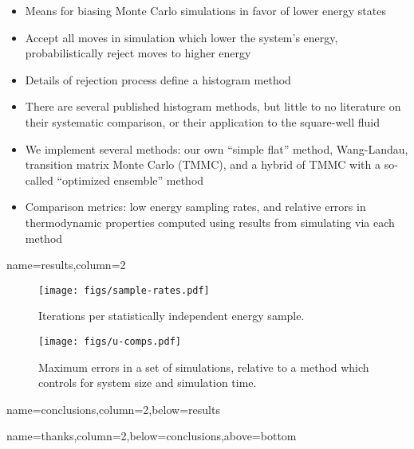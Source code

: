 \documentclass[paperwidth=48in,paperheight=36in,
fontscale=0.27,margin=0.75in]{baposter}
\begin{document}
\begin{poster}
{    %


    \begin{itemize}
    \item Means for biasing Monte Carlo simulations in favor of lower
      energy states
    \item Accept all moves in simulation which lower the system's
      energy, probabilistically reject moves to higher energy
    \item Details of rejection process define a histogram method
    \item There are several published histogram methods, but little to
      no literature on their systematic comparison, or their
      application to the square-well fluid
    \item We implement several methods: our own ``simple flat''
      method, Wang-Landau, transition matrix Monte Carlo (TMMC), and a
      hybrid of TMMC with a so-called ``optimized ensemble'' method
    \item Comparison metrics: low energy sampling rates, and relative
      errors in thermodynamic properties computed using results from
      simulating via each method
    \end{itemize}

  }

  {name=results,column=2}{%

    \begin{figure}[H]
      \centering
      \texttt{[image: figs/sample-rates.pdf]}
      \caption{Iterations per statistically independent energy
        sample.}
      \label{fig:sample_rates}
    \end{figure}
    \begin{figure}[H]
      \centering
      \texttt{[image: figs/u-comps.pdf]}
      \caption{Maximum errors in a set of simulations, relative to a
        method which controls for system size and simulation time.}
      \label{fig:errors}
    \end{figure}

  }

  {name=conclusions,column=2,below=results}{%



  }

  {name=thanks,column=2,below=conclusions,above=bottom}{%



  }

\end{poster}
\end{document}
